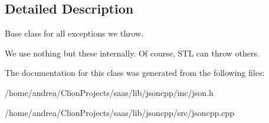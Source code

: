 \subsection{Detailed Description}
Base class for all exceptions we throw.

We use nothing but these internally. Of course, S\+TL can throw others. 

The documentation for this class was generated from the following files\+:\begin{DoxyCompactItemize}
\item 
/home/andrea/\+Clion\+Projects/saas/lib/jsoncpp/inc/json.\+h\item 
/home/andrea/\+Clion\+Projects/saas/lib/jsoncpp/src/jsoncpp.\+cpp\end{DoxyCompactItemize}
